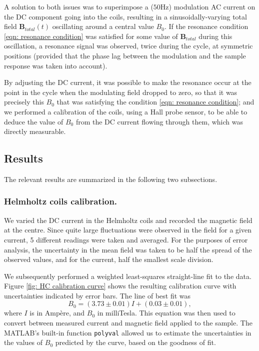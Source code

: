 \documentclass[a4paper]{jpconf}
\numberwithin{equation}{section}
\begin{document}
A solution to both issues was to superimpose a ($50 \si{\hertz}$) modulation AC current on the DC component going into the coils, resulting in a sinusoidally-varying total field $\mathbf{B}_{total}(t)$ oscillating around a central value $B_0$. If the resonance condition \eqref{eqn: resonance condition} was satisfied for some value of $\mathbf{B}_{total}$ during this oscillation, a resonance signal was observed, twice during the cycle, at symmetric positions (provided that the phase lag between the modulation and the sample response was taken into account). 

By adjusting the DC current, it was possible to make the resonance occur at the point in the cycle when the modulating field dropped to zero, so that it was precisely this $B_0$ that was satisfying the condition \eqref{eqn: resonance condition}; and we performed a calibration of the coils, using a Hall probe sensor, to be able to deduce the value of $B_0$ from the DC current flowing through them, which was directly measurable. 

\subsection{Results}
The relevant results are summarized in the following two subsections.

\subsubsection{Helmholtz coils calibration.} \label{section: calibration}
We varied the DC current in the Helmholtz coils and recorded the magnetic field at the centre. Since quite large fluctuations were observed in the field for a given current, 5 different readings were taken and averaged. For the purposes of error analysis, the uncertainty in the mean field was taken to be half the spread of the observed values, and for the current, half the smallest scale division. 

We subsequently performed a weighted least-squares straight-line fit to the data. Figure \ref{fig: HC calibration curve} shows the resulting calibration curve with uncertainties indicated by error bars. The line of best fit was 
\[
B_0 = (3.73 \pm 0.01) I + (0.03 \pm 0.01),
\]
where $I$ is in Amp\`ere, and $B_0$ in milliTesla. This equation was then used to convert between measured current and magnetic field applied to the sample. The MATLAB's built-in function \texttt{polyval} allowed us to estimate the uncertainties in the values of $B_0$ predicted by the curve, based on the goodness of fit.
\end{document}

